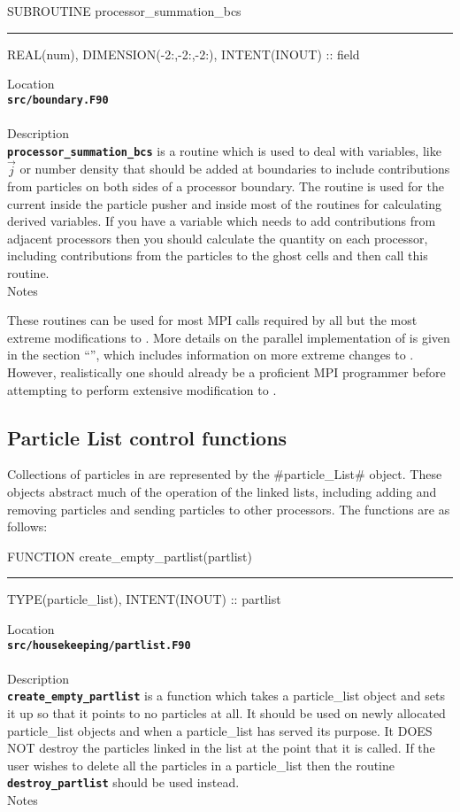 \documentclass[12pt,a4paper]{article}
\newcommand{\HRule}{\rule[0.3cm]{\linewidth}{0.5mm}}
\newcommand{\inlinecode}[1]{{\color{warwickred} \bf\texttt{#1}}}
\newcommand{\EPOCH}{{\color{warwickdark}\fontfamily{phv}\selectfont{EPOCH}}}
\begin{document}
\pagebreak
\begin{codedef}
SUBROUTINE processor_summation_bcs
\HRule
REAL(num), DIMENSION(-2:,-2:,-2:), INTENT(INOUT) :: field
\end{codedef}
\vspace{1cm}
{\Large Location\\}
\inlinecode{src/boundary.F90}\\
\\[0.5cm]
{\Large Description\\}
\inlinecode{processor\_summation\_bcs} is a routine which is used to deal with
variables, like $\vec{j}$ or number density that should be added at boundaries
to include contributions from particles on both sides of a processor boundary.
The routine is used for the current inside the particle pusher and inside most
of the routines for calculating derived variables. If you have a variable
which needs to add contributions from adjacent processors then you should
calculate the quantity on each processor, including contributions from the
particles to the ghost cells and then call this routine.
\\[0.5cm]
{\Large Notes\\}
\pagebreak

These routines can be used for most MPI calls required by all but the most
extreme modifications to {\EPOCH}. More details on the parallel
implementation of {\EPOCH} is given in the section ``'', which
includes information on more extreme changes to {\EPOCH}. However,
realistically one should already be a proficient MPI programmer before
attempting to perform extensive modification to {\EPOCH}.

\subsection{Particle List control functions}
Collections of particles in {\EPOCH} are represented by the #particle_List#
object. These objects abstract much of the operation of the linked lists,
including adding and removing particles and sending particles to other
processors. The functions are as follows:

\pagebreak
\begin{codedef}
FUNCTION create_empty_partlist(partlist)
\HRule
TYPE(particle_list), INTENT(INOUT) :: partlist
\end{codedef}
\vspace{1cm}
{\Large Location\\}
\inlinecode{src/housekeeping/partlist.F90}\\
\\[0.5cm]
{\Large Description\\}
\inlinecode{create\_empty\_partlist} is a function which takes a particle\_list
object and sets it up so that it points to no particles at all. It should be
used on newly allocated particle\_list objects and when a particle\_list has
served its purpose. It DOES NOT destroy the particles linked in the list at
the point that it is called. If the user wishes to delete all the particles in a
particle\_list then the routine \inlinecode{destroy\_partlist} should be used
instead.
\\[0.5cm]
{\Large Notes\\}
\end{document}
